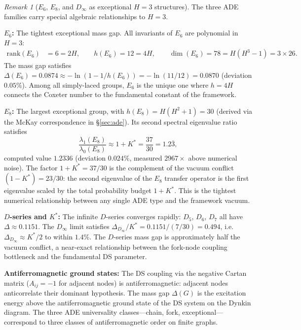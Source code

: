 \documentclass[11pt,a4paper]{article}
\theoremstyle{definition}
\theoremstyle{remark}
\newtheorem{remark}[theorem]{Remark}
\begin{document}
\begin{remark}[$E_6$, $E_8$, and $D_\infty$ as exceptional $H=3$ structures]\label{rem:ade_exceptional}
The three ADE families carry special algebraic relationships to $H=3$.

\textbf{$E_6$:} The tightest exceptional mass gap. All invariants of $E_6$ are polynomial in $H=3$:
\begin{align}
\mathrm{rank}(E_6) &= 6 = 2H, \qquad h(E_6) = 12 = 4H, \qquad \dim(E_6) = 78 = H(H^3-1) = 3\times 26. \label{eq:E6_invts}
\end{align}
The mass gap satisfies $\Delta(E_6)=0.0874\approx -\ln(1-1/h(E_6))=-\ln(11/12)=0.0870$ (deviation $0.05\%$). Among all simply-laced groups, $E_6$ is the unique one where $h=4H$ connects the Coxeter number to the fundamental constant of the framework.

\textbf{$E_8$:} The largest exceptional group, with $h(E_8)=H(H^2+1)=30$ (derived via the McKay correspondence in \S\ref{sec:ade}). Its second spectral eigenvalue ratio satisfies
\begin{equation}\label{eq:E8_second_ratio}
\frac{\lambda_1(E_8)}{\lambda_0(E_8)} \approx 1+K^* = \frac{37}{30} = 1.2\overline{3},
\end{equation}
computed value $1.2336$ (deviation $0.024\%$, measured $2967\times$ above numerical noise). The factor $1+K^*=37/30$ is the complement of the vacuum conflict $(1-K^*)=23/30$: the second eigenvalue of the $E_8$ transfer operator is the first eigenvalue scaled by the total probability budget $1+K^*$. This is the tightest numerical relationship between any single ADE type and the framework vacuum.

\textbf{$D$-series and $K^*$:} The infinite $D$-series converges rapidly: $D_5$, $D_6$, $D_7$ all have $\Delta\approx 0.1151$. The $D_\infty$ limit satisfies $\Delta_{D_\infty}/K^* = 0.1151/(7/30) = 0.494$, i.e.\ $\Delta_{D_\infty}\approx K^*/2$ to within $1.4\%$. The $D$-series mass gap is approximately half the vacuum conflict, a near-exact relationship between the fork-node coupling bottleneck and the fundamental DS parameter.

\textbf{Antiferromagnetic ground states:} The DS coupling via the negative Cartan matrix ($A_{ij}=-1$ for adjacent nodes) is antiferromagnetic: adjacent nodes anticorrelate their dominant hypothesis. The mass gap $\Delta(G)$ is the excitation energy above the antiferromagnetic ground state of the DS system on the Dynkin diagram. The three ADE universality classes---chain, fork, exceptional---correspond to three classes of antiferromagnetic order on finite graphs.
\end{remark}
\end{document}
